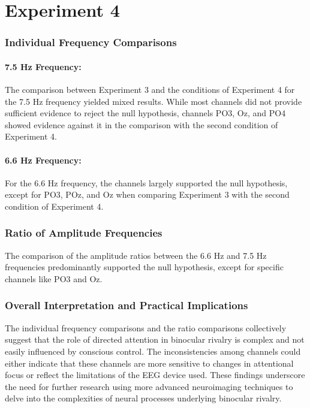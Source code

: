 \section{Experiment 4}

\subsubsection{Individual Frequency Comparisons}

\paragraph{7.5 Hz Frequency:} 
The comparison between Experiment 3 and the conditions of Experiment 4 for the 7.5 Hz frequency yielded mixed results. While most channels did not provide sufficient evidence to reject the null hypothesis, channels PO3, Oz, and PO4 showed evidence against it in the comparison with the second condition of Experiment 4.

\paragraph{6.6 Hz Frequency:} 
For the 6.6 Hz frequency, the channels largely supported the null hypothesis, except for PO3, POz, and Oz when comparing Experiment 3 with the second condition of Experiment 4.

\subsubsection{Ratio of Amplitude Frequencies}

The comparison of the amplitude ratios between the 6.6 Hz and 7.5 Hz frequencies predominantly supported the null hypothesis, except for specific channels like PO3 and Oz.

\subsubsection{Overall Interpretation and Practical Implications}

The individual frequency comparisons and the ratio comparisons collectively suggest that the role of directed attention in binocular rivalry is complex and not easily influenced by conscious control. The inconsistencies among channels could either indicate that these channels are more sensitive to changes in attentional focus or reflect the limitations of the EEG device used. These findings underscore the need for further research using more advanced neuroimaging techniques to delve into the complexities of neural processes underlying binocular rivalry.


